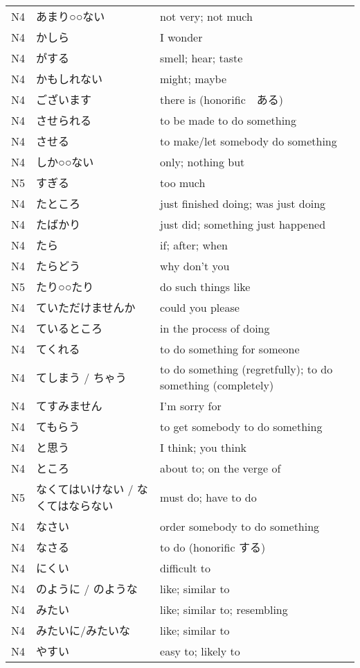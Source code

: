 \begin{table}[h!]
\begin{tabular}{lll}
N4	&   あまり○○ない &	not very; not much\\
N4	&   かしら &       	I wonder\\
N4	&   がする &       	smell; hear; taste\\
N4	&   かもしれない  &	might; maybe\\
N4	&   ございます   &	there is (honorific　ある)\\
N4	&   させられる   &	to be made to do something\\
N4	&   させる &       	to make/let somebody do something\\
N4	&   しか○○ない &	    only; nothing but\\
N5	&   すぎる     &   	too much\\
N4	&   たところ    &   	just finished doing; was just doing\\
N4	&   たばかり    &   	just did; something just happened\\
N4	&   たら  &       	if; after; when\\
N4	&   たらどう    &	why don't you\\
N5	&   たり○○たり  &	do such things like\\
N4	&   ていただけませんか&	could you please\\
N4	&   ているところ  &	in the process of doing\\
N4	&   てくれる    &	to do something for someone \\
N4	&   てしまう / ちゃう  &	to do something (regretfully); to do something (completely) \\
N4	&   てすみません  &	I'm sorry for\\
N4	&   てもらう    &	to get somebody to do something\\
N4	&   と思う &       	I think; you think\\
N4	&   ところ     &   	about to; on the verge of\\
N5	&   なくてはいけない / なくてはならない &	must do; have to do\\
N4	&   なさい	&       order somebody to do something\\
N4	&   なさる &       	to do (honorific する) \\
N4	&   にくい     &   	difficult to\\
N4	&   のように / のような &	like; similar to\\
N4	&   みたい &       	like; similar to; resembling\\
N4	&   みたいに/みたいな   &	like; similar to\\
N4	&   やすい &       	easy to; likely to\\

\end{tabular}
\end{table}
